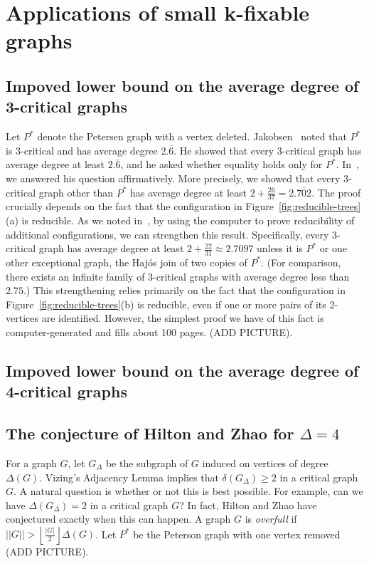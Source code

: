 \documentclass[12pt]{article}
\theoremstyle{plain}
\theoremstyle{definition}
\theoremstyle{remark}
\newcommand{\floor}[1]{\left\lfloor#1\right\rfloor}
\begin{document}
\section{Applications of small k-fixable graphs}
\subsection{Impoved lower bound on the average degree of 3-critical graphs}
Let $P^*$ denote the Petersen graph with a vertex deleted.
Jakobsen~\cite{Jakobsen73,Jakobsen74} noted that $P^*$ is 3-critical and has
average degree $2.\overline{6}$.  He showed that every 3-critical graph has average
degree at least $2.\overline{6}$, and he asked whether equality holds only for $P^*$.
In~\cite{3criticalCR}, we answered his question affirmatively.  More precisely,
we showed that every 3-critical graph other than $P^*$ has average degree at
least $2+\frac{26}{37}=2.\overline{702}$.  The proof crucially depends on the
fact that the configuration in Figure~\ref{fig:reducible-trees}(a) is reducible.
As we noted in~\cite{3criticalCR}, by using the computer to prove reducibility
of additional configurations, we can strengthen this result.  Specifically,
every 3-critical graph has average degree at least $2+\frac{22}{31} \approx
2.7097$ unless it is $P^*$ or one other exceptional graph, the Haj\'{o}s
join of two copies of $P^*$.  (For comparison, there exists an infinite family of
3-critical graphs with average degree less than $2.75$.)  This strengthening
relies primarily on the fact that the configuration in
Figure~\ref{fig:reducible-trees}(b) is reducible, even if one or more pairs of
its 2-vertices are identified.  However, the simplest proof we have of this fact
is computer-generated and fills about 100 pages. (ADD PICTURE).

\subsection{Impoved lower bound on the average degree of 4-critical graphs}
\subsection{The conjecture of Hilton and Zhao for $\Delta=4$}
For a graph $G$, let $G_\Delta$ be the subgraph of $G$ induced on vertices of
degree $\Delta(G)$.  Vizing's Adjacency Lemma implies that $\delta(G_\Delta) \ge
2$ in a critical graph $G$.  A natural question is whether or not this is 
best possible.  For example, can we have $\Delta(G_\Delta) = 2$ in a
critical graph $G$?  In fact, Hilton and Zhao have conjectured exactly when
this can happen.  A graph $G$ is \emph{overfull} if $||G|| >
\floor{\frac{|G|}{2}}\Delta(G)$.  Let $P^*$ be the Peterson graph with one
vertex removed (ADD PICTURE).
\end{document}
